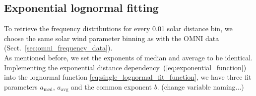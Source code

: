 \subsection{Exponential lognormal fitting}
To retrieve the frequency distributions for every \SI{0.01}{\au} solar distance bin, we choose the same solar wind parameter binning as with the OMNI data (Sect.~\ref{sec:omni_frequency_data}).\\

As mentioned before, we set the exponents of median and average to be identical. Implementing the exponential distance dependency~(\ref{eq:exponential_function}) into the lognormal function \ref{eq:single_lognormal_fit_function}, we have three fit parameters $a_\text{med}$, $a_\text{avg}$ and the common exponent $b$. (change variable naming...)

